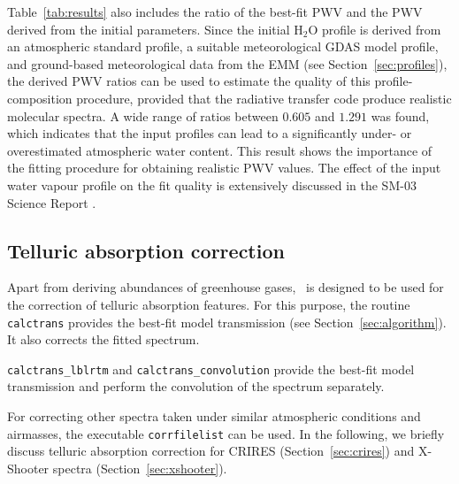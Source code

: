 Table~\ref{tab:results} also includes the ratio of the best-fit \ac{PWV} and
the \ac{PWV} derived from the initial parameters. Since the initial H$_2$O
profile is derived from an atmospheric standard profile, a suitable
meteorological \ac{GDAS} model profile, and ground-based meteorological data
from the \ac{EMM} (see Section~\ref{sec:profiles}), the derived \ac{PWV} ratios
can be used to estimate the quality of this profile-composition procedure,
provided that the radiative transfer code produce realistic molecular spectra.
A wide range of ratios between $0.605$ and $1.291$ was found, which indicates
that the input profiles can lead to a significantly under- or overestimated
atmospheric water content. This result shows the importance of the fitting
procedure for obtaining realistic \ac{PWV} values. The effect of the input
water vapour profile on the fit quality is extensively discussed in the
SM-03 Science Report \cite{SM03SR}.

\subsection{Telluric absorption correction}\label{sec:tactest}
Apart from deriving abundances of greenhouse gases, \mf\ is designed to
be used for the correction of telluric absorption features. For this
purpose, the routine {\tt calctrans} provides the best-fit model transmission
(see Section~\ref{sec:algorithm}). It also corrects the fitted spectrum.

{\tt calctrans\_lblrtm} and {\tt calctrans\_convolution} provide the best-fit
model transmission and perform the convolution of the spectrum separately.

\sloppy For
correcting other spectra taken under similar atmospheric conditions and
airmasses, the executable {\tt corrfilelist} can be used. In the following, we
briefly discuss telluric absorption correction for CRIRES
(Section~\ref{sec:crires}) and X-Shooter spectra (Section~\ref{sec:xshooter}).

